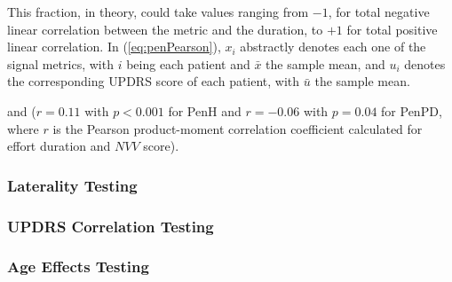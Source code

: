 \noindent
This fraction, in theory, could take values ranging from $-1$, for total negative linear correlation between the metric and the duration, to $+1$ for total positive linear correlation. In (\ref{eq:penPearson}), $x_{i}$ abstractly denotes each one of the signal metrics, with $i$ being each patient and $\bar{x}$ the sample mean, and $u_{i}$ denotes the corresponding \gls{UPDRS} score of each patient, with $\bar{u}$ the sample mean.

and ($r=0.11$ with $p<0.001$ for \gls{PenH} and $r= -0.06$ with $p=0.04$ for \gls{PenPD}, where $r$ is the Pearson product-moment correlation coefficient calculated for effort duration and $NVV$ score). 

\subsubsection{Laterality Testing}
\label{subsubsec:PenCTLateralityTesting}

\subsubsection{UPDRS Correlation Testing}
\label{subsubsec:PenCTUPDRSCorTesting}

\subsubsection{Age Effects Testing}
\label{subsubsec:PenCTAgeEffectsTesting}

